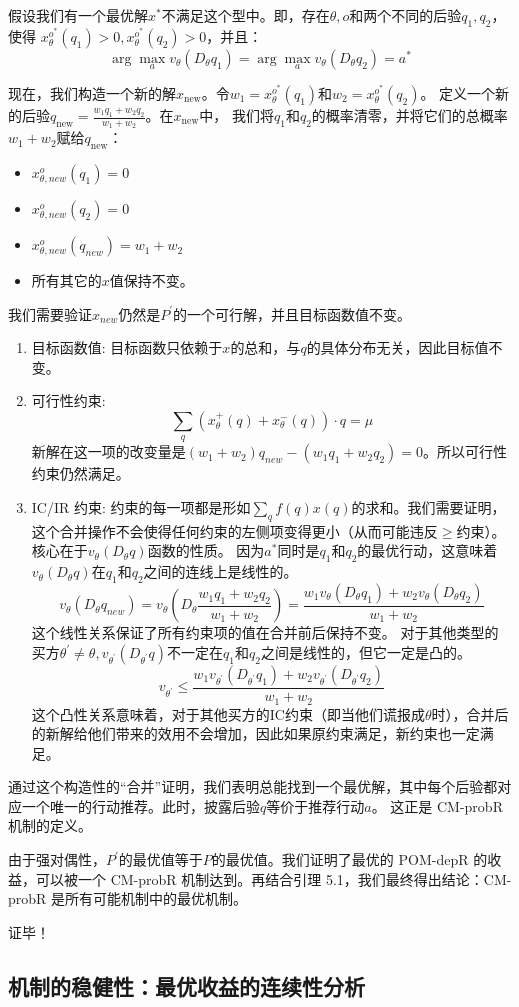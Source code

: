 假设我们有一个最优解$x^\ast$不满足这个型中。即，存在$\theta,o$和两个不同的后验$q_1,q_2$，使得
$x_{\theta}^{o^\ast}(q_1)>0, x_{\theta}^{o^\ast}(q_2)>0$，并且：
$$\arg \max_{a} v_{\theta} (D_{\theta}q_1)=\arg\max_{a}v_{\theta}(D_{\theta}q_2)=a^\ast$$

现在，我们构造一个新的解$x_{\text{new}}$。令$w_1=x_{\theta}^{o^\ast}(q_1)$和$w_2=x_{\theta}^{o^\ast}(q_2)$。
定义一个新的后验$q_{\text{new}} = \frac{w_1 q_1 + w_2 q_2}{w_1 + w_2}$。在$x_{\text{new}}$中，
我们将$q_1$和$q_2$的概率清零，并将它们的总概率$w_1 + w_2$赋给$q_{\text{new}}$：

\begin{itemize}
    \item $x_{\theta,new}^{o}(q_1) = 0$
    \item $x_{\theta,new}^{o}(q_2) = 0$
    \item $x_{\theta,new}^{o}(q_{new}) = w_1 + w_2$
    \item 所有其它的$x$值保持不变。
\end{itemize}

我们需要验证$x_{new}$仍然是$P^\prime$的一个可行解，并且目标函数值不变。

\begin{enumerate}
    \item 目标函数值: 目标函数只依赖于$x$的总和，与$q$的具体分布无关，因此目标值不变。
    \item 可行性约束:$$\sum\limits_{q}\left(x_{\theta}^{+}(q)+x_{\theta}^{-}(q)\right)\cdot q = \mu$$ 新解在这一项的改变量是$(w_1 + w_2) q_{new} - (w_1 q_1 + w_2 q_2) = 0$。所以可行性约束仍然满足。
    \item IC/IR 约束: 约束的每一项都是形如$\sum\limits_{q}f(q)x(q)$的求和。我们需要证明，这个合并操作不会使得任何约束的左侧项变得更小（从而可能违反$\geq$约束）。核心在于$v_\theta (D_\theta q)$函数的性质。
    因为$a^\ast$同时是$q_1$和$q_2$的最优行动，这意味着$v_\theta (D_\theta q)$在$q_1$和$q_2$之间的连线上是线性的。$$v_{\theta} (D_{\theta} q_{new}) = v_{\theta} \left(D_{\theta} \frac{w_1 q_1 + w_2 q_2}{w_1 + w_2}\right) = \frac{w_1 v_{\theta}(D_{\theta} q_1) + w_2 v_{\theta} (D_{\theta} q_2)}{w_1 + w_2}$$ 这个线性关系保证了所有约束项的值在合并前后保持不变。
    对于其他类型的买方$\theta^\prime \neq \theta,v_{\theta^\prime} (D_{\theta^\prime} q)$不一定在$q_1$和$q_2$之间是线性的，但它一定是凸的。$$v_{\theta^\prime}\leq \frac{w_1 v_{\theta^\prime}(D_{\theta^\prime}q_1) + w_2 v_{\theta^\prime}(D_{\theta^\prime}q_2)}{w_1 + w_2}$$ 这个凸性关系意味着，对于其他买方的IC约束（即当他们谎报成$\theta$时），合并后的新解给他们带来的效用不会增加，因此如果原约束满足，新约束也一定满足。 
\end{enumerate}

通过这个构造性的“合并”证明，我们表明总能找到一个最优解，其中每个后验都对应一个唯一的行动推荐。此时，披露后验$q$等价于推荐行动$a$。
这正是 CM-probR 机制的定义。

由于强对偶性，$P^\prime$的最优值等于$P$的最优值。我们证明了最优的 POM-depR 的收益，可以被一个 CM-probR 机制达到。再结合引理 5.1，我们最终得出结论：CM-probR 是所有可能机制中的最优机制。

证毕！

\subsection{机制的稳健性：最优收益的连续性分析}

